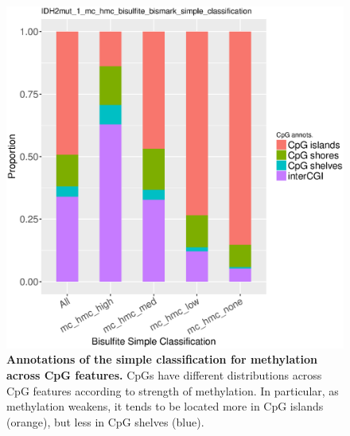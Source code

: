 \begin{figure}[ht!]
\centering
\includegraphics[width=1\textwidth]{chap5figs/figure5_8.eps}
\caption[Annotations of the simple classification.]
{
\textbf{Annotations of the simple classification for methylation across CpG features.} CpGs have different distributions across CpG features according to strength of methylation. In particular, as methylation weakens, it tends to be located more in CpG islands (orange), but less in CpG shelves (blue).
}
\label{chap5:fig:8}
\end{figure}

\newpage

